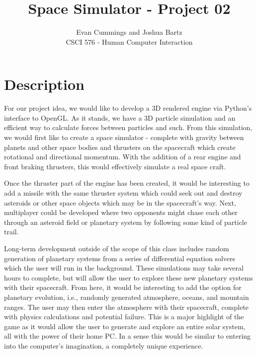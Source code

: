 
\DeclareMathOperator*{\argmax}{arg\,max}


\small

\title{Space Simulator - Project 02}
\author{Evan Cummings and Joshua Bartz\\
CSCI 576 - Human Computer Interaction}

\maketitle

\section*{Description}

For our project idea, we would like to develop a 3D rendered engine via Python's interface to OpenGL.  As it stands, we have a 3D particle simulation and an efficient way to calculate forces between particles and such.  From this simulation, we would first like to create a space simulator - complete with gravity between planets and other space bodies and thrusters on the spacecraft which create rotational and directional momentum.  With the addition of a rear engine and front braking thrusters, this would effectively simulate a real space craft.  

Once the thruster part of the engine has been created, it would be interesting to add a missile with the same thruster system which could seek out and destroy asteroids or other space objects which may be in the spacecraft's way.  Next, multiplayer could be developed where two opponents might chase each other through an asteroid field or planetary system by following some kind of particle trail.  

Long-term development outside of the scope of this class includes random generation of planetary systems from a series of differential equation solvers which the user will run in the background.  These simulations may take several hours to complete, but will allow the user to explore these new planetary systems with their spacecraft.  From here, it would be interesting to add the option for planetary evolution, i.e., randomly generated atmosphere, oceans, and mountain ranges.  The user may then enter the atmosphere with their spacecraft, complete with physics calculations and potential failure.  This is a major highlight of the game as it would allow the user to generate and explore an entire solar system, all with the power of their home PC.  In a sense this would be similar to entering into the computer's imagination, a completely unique experience.

